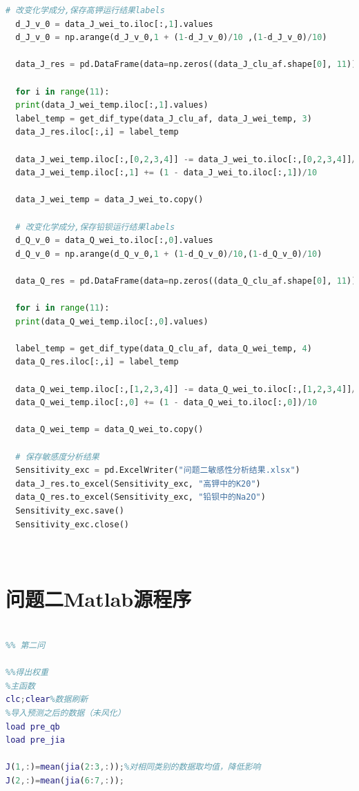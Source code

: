 \documentclass[withoutpreface,bwprint]{cumcmthesis} %
\begin{document}
\begin{appendices}
\begin{lstlisting}[language=python]
  # 改变化学成分,保存高钾运行结果labels
  d_J_v_0 = data_J_wei_to.iloc[:,1].values
  d_J_v_0 = np.arange(d_J_v_0,1 + (1-d_J_v_0)/10 ,(1-d_J_v_0)/10) 
  
  data_J_res = pd.DataFrame(data=np.zeros((data_J_clu_af.shape[0], 11)),columns=d_J_v_0)
  
  for i in range(11):
  print(data_J_wei_temp.iloc[:,1].values)
  label_temp = get_dif_type(data_J_clu_af, data_J_wei_temp, 3)
  data_J_res.iloc[:,i] = label_temp
  
  data_J_wei_temp.iloc[:,[0,2,3,4]] -= data_J_wei_to.iloc[:,[0,2,3,4]]/10
  data_J_wei_temp.iloc[:,1] += (1 - data_J_wei_to.iloc[:,1])/10
  
  data_J_wei_temp = data_J_wei_to.copy()
  
  # 改变化学成分,保存铅钡运行结果labels
  d_Q_v_0 = data_Q_wei_to.iloc[:,0].values
  d_Q_v_0 = np.arange(d_Q_v_0,1 + (1-d_Q_v_0)/10,(1-d_Q_v_0)/10)
  
  data_Q_res = pd.DataFrame(data=np.zeros((data_Q_clu_af.shape[0], 11)),columns=d_Q_v_0)
  
  for i in range(11):
  print(data_Q_wei_temp.iloc[:,0].values)
  
  label_temp = get_dif_type(data_Q_clu_af, data_Q_wei_temp, 4)
  data_Q_res.iloc[:,i] = label_temp
  
  data_Q_wei_temp.iloc[:,[1,2,3,4]] -= data_Q_wei_to.iloc[:,[1,2,3,4]]/10
  data_Q_wei_temp.iloc[:,0] += (1 - data_Q_wei_to.iloc[:,0])/10
  
  data_Q_wei_temp = data_Q_wei_to.copy()
  
  # 保存敏感度分析结果
  Sensitivity_exc = pd.ExcelWriter("问题二敏感性分析结果.xlsx")
  data_J_res.to_excel(Sensitivity_exc, "高钾中的K20")
  data_Q_res.to_excel(Sensitivity_exc, "铅钡中的Na2O")
  Sensitivity_exc.save()
  Sensitivity_exc.close()
  
  
\end{lstlisting}

\newpage
\section{问题二Matlab源程序}

\begin{lstlisting}[language=matlab]

%% 第二问

%%得出权重
%主函数
clc;clear%数据刷新
%导入预测之后的数据（未风化）
load pre_qb
load pre_jia

J(1,:)=mean(jia(2:3,:));%对相同类别的数据取均值，降低影响
J(2,:)=mean(jia(6:7,:));


\end{lstlisting}
\end{appendices}
\end{document}
